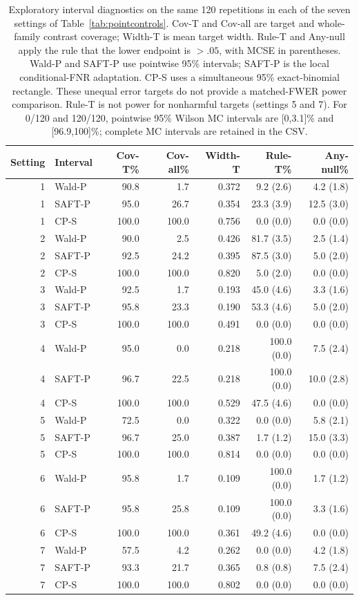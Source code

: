 \begin{table}[t]
\centering\small
\caption{Exploratory interval diagnostics on the same 120 repetitions in each of the seven settings of Table~\ref{tab:pointcontrols}. Cov-T and Cov-all are target and whole-family contrast coverage; Width-T is mean target width. Rule-T and Any-null apply the rule that the lower endpoint is $>.05$, with MCSE in parentheses. Wald-P and SAFT-P use pointwise 95\% intervals; SAFT-P is the local conditional-FNR adaptation. CP-S uses a simultaneous 95\% exact-binomial rectangle. These unequal error targets do not provide a matched-FWER power comparison. Rule-T is not power for nonharmful targets (settings 5 and 7). For 0/120 and 120/120, pointwise 95\% Wilson MC intervals are [0,3.1]\% and [96.9,100]\%; complete MC intervals are retained in the CSV.}\label{tab:intervals}
\begin{tabular}{rlrrrrr}
\toprule
Setting & Interval & Cov-T\% & Cov-all\% & Width-T & Rule-T\% & Any-null\% \\
\midrule
1 & Wald-P & 90.8 & 1.7 & 0.372 & 9.2 (2.6) & 4.2 (1.8) \\
1 & SAFT-P & 95.0 & 26.7 & 0.354 & 23.3 (3.9) & 12.5 (3.0) \\
1 & CP-S & 100.0 & 100.0 & 0.756 & 0.0 (0.0) & 0.0 (0.0) \\
2 & Wald-P & 90.0 & 2.5 & 0.426 & 81.7 (3.5) & 2.5 (1.4) \\
2 & SAFT-P & 92.5 & 24.2 & 0.395 & 87.5 (3.0) & 5.0 (2.0) \\
2 & CP-S & 100.0 & 100.0 & 0.820 & 5.0 (2.0) & 0.0 (0.0) \\
3 & Wald-P & 92.5 & 1.7 & 0.193 & 45.0 (4.6) & 3.3 (1.6) \\
3 & SAFT-P & 95.8 & 23.3 & 0.190 & 53.3 (4.6) & 5.0 (2.0) \\
3 & CP-S & 100.0 & 100.0 & 0.491 & 0.0 (0.0) & 0.0 (0.0) \\
4 & Wald-P & 95.0 & 0.0 & 0.218 & 100.0 (0.0) & 7.5 (2.4) \\
4 & SAFT-P & 96.7 & 22.5 & 0.218 & 100.0 (0.0) & 10.0 (2.8) \\
4 & CP-S & 100.0 & 100.0 & 0.529 & 47.5 (4.6) & 0.0 (0.0) \\
5 & Wald-P & 72.5 & 0.0 & 0.322 & 0.0 (0.0) & 5.8 (2.1) \\
5 & SAFT-P & 96.7 & 25.0 & 0.387 & 1.7 (1.2) & 15.0 (3.3) \\
5 & CP-S & 100.0 & 100.0 & 0.814 & 0.0 (0.0) & 0.0 (0.0) \\
6 & Wald-P & 95.8 & 1.7 & 0.109 & 100.0 (0.0) & 1.7 (1.2) \\
6 & SAFT-P & 95.8 & 25.8 & 0.109 & 100.0 (0.0) & 3.3 (1.6) \\
6 & CP-S & 100.0 & 100.0 & 0.361 & 49.2 (4.6) & 0.0 (0.0) \\
7 & Wald-P & 57.5 & 4.2 & 0.262 & 0.0 (0.0) & 4.2 (1.8) \\
7 & SAFT-P & 93.3 & 21.7 & 0.365 & 0.8 (0.8) & 7.5 (2.4) \\
7 & CP-S & 100.0 & 100.0 & 0.802 & 0.0 (0.0) & 0.0 (0.0) \\
\bottomrule
\end{tabular}
\end{table}
